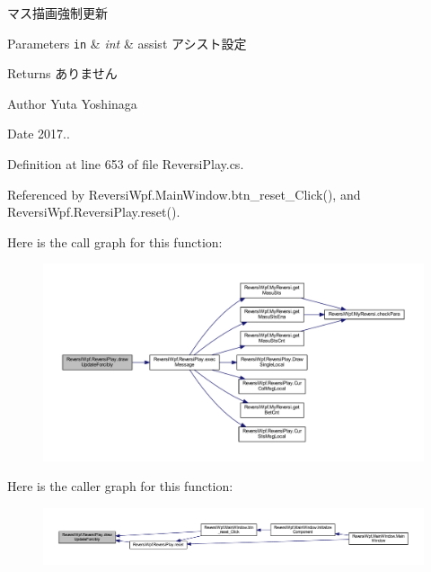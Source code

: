 マス描画強制更新 


\begin{DoxyParams}[1]{Parameters}
\mbox{\tt in}  & {\em int} & assist アシスト設定 \\
\hline
\end{DoxyParams}
\begin{DoxyReturn}{Returns}
ありません 
\end{DoxyReturn}
\begin{DoxyAuthor}{Author}
Yuta Yoshinaga 
\end{DoxyAuthor}
\begin{DoxyDate}{Date}
2017.. 
\end{DoxyDate}


Definition at line 653 of file Reversi\+Play.\+cs.



Referenced by Reversi\+Wpf.\+Main\+Window.\+btn\+\_\+reset\+\_\+\+Click(), and Reversi\+Wpf.\+Reversi\+Play.\+reset().

Here is the call graph for this function\+:\nopagebreak
\begin{figure}[H]
\begin{center}
\leavevmode
\includegraphics[width=350pt]{class_reversi_wpf_1_1_reversi_play_a0324e804add5c651915266f0254eb26f_cgraph}
\end{center}
\end{figure}
Here is the caller graph for this function\+:
\nopagebreak
\begin{figure}[H]
\begin{center}
\leavevmode
\includegraphics[width=350pt]{class_reversi_wpf_1_1_reversi_play_a0324e804add5c651915266f0254eb26f_icgraph}
\end{center}
\end{figure}
\mbox{\label{class_reversi_wpf_1_1_reversi_play_aa9c1ae9fc1af06e7e73f9db980cf0cfa}} 
